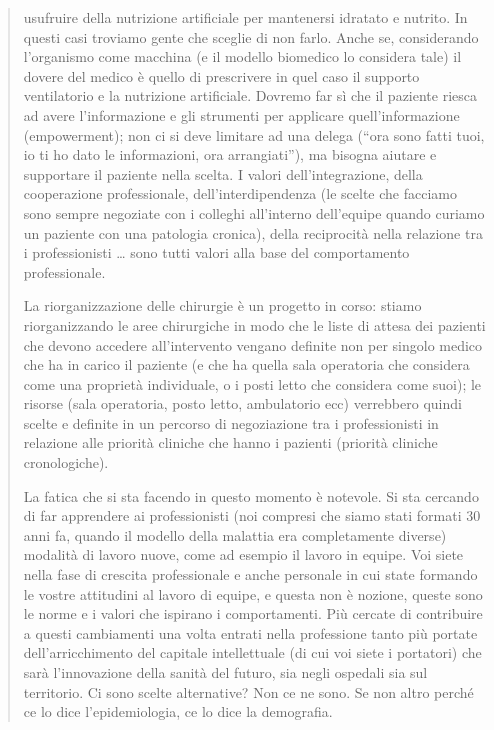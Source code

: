 \documentclass[]{article}
\begin{document}
\begin{quote}
usufruire della nutrizione artificiale per mantenersi idratato e
nutrito. In questi casi troviamo gente che sceglie di non farlo. Anche
se, considerando l'organismo come macchina (e il modello biomedico lo
considera tale) il dovere del medico è quello di prescrivere in quel
caso il supporto ventilatorio e la nutrizione artificiale. Dovremo far
sì che il paziente riesca ad avere l'informazione e gli strumenti per
applicare quell'informazione (empowerment); non ci si deve limitare ad
una delega (``ora sono fatti tuoi, io ti ho dato le informazioni, ora
arrangiati''), ma bisogna aiutare e supportare il paziente nella scelta.
I valori dell'integrazione, della cooperazione professionale,
dell'interdipendenza (le scelte che facciamo sono sempre negoziate con i
colleghi all'interno dell'equipe quando curiamo un paziente con una
patologia cronica), della reciprocità nella relazione tra i
professionisti \ldots{} sono tutti valori alla base del comportamento
professionale.

La riorganizzazione delle chirurgie è un progetto in corso: stiamo
riorganizzando le aree chirurgiche in modo che le liste di attesa dei
pazienti che devono accedere all'intervento vengano definite non per
singolo medico che ha in carico il paziente (e che ha quella sala
operatoria che considera come una proprietà individuale, o i posti letto
che considera come suoi); le risorse (sala operatoria, posto letto,
ambulatorio ecc) verrebbero quindi scelte e definite in un percorso di
negoziazione tra i professionisti in relazione alle priorità cliniche
che hanno i pazienti (priorità cliniche cronologiche).

La fatica che si sta facendo in questo momento è notevole. Si sta
cercando di far apprendere ai professionisti (noi compresi che siamo
stati formati 30 anni fa, quando il modello della malattia era
completamente diverse) modalità di lavoro nuove, come ad esempio il
lavoro in equipe. Voi siete nella fase di crescita professionale e anche
personale in cui state formando le vostre attitudini al lavoro di
equipe, e questa non è nozione, queste sono le norme e i valori che
ispirano i comportamenti. Più cercate di contribuire a questi
cambiamenti una volta entrati nella professione tanto più portate
dell'arricchimento del capitale intellettuale (di cui voi siete i
portatori) che sarà l'innovazione della sanità del futuro, sia negli
ospedali sia sul territorio. Ci sono scelte alternative? Non ce ne sono.
Se non altro perché ce lo dice l'epidemiologia, ce lo dice la
demografia.


\end{quote}
\end{document}
